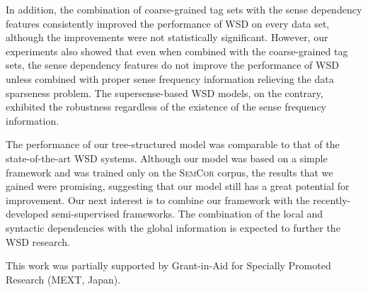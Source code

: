 \documentclass[english]{jnlp_1.4}
\begin{document}
In addition, the combination of coarse-grained tag sets with the sense dependency features consistently improved the performance of WSD on every data set, although the improvements were not statistically significant.
However, our experiments also showed that even when combined with the coarse-grained tag sets, the sense dependency features do not improve the performance of WSD unless combined with proper sense frequency information relieving the data sparseness problem.
The supersense-based WSD models, on the contrary, exhibited the robustness regardless of the existence of the sense frequency information.

The performance of our tree-structured model was comparable to that of the state-of-the-art WSD systems.
Although our model was based on a simple framework and was trained only on the \textsc{SemCor} corpus, the results that we gained were promising, suggesting that our model still has a great potential for improvement.
Our next interest is to combine our framework with the recently-developed semi-supervised frameworks.
The combination of the local and syntactic dependencies with the global information is expected to further the WSD research.



\acknowledgment
This work was partially supported by Grant-in-Aid for Specially Promoted Research (MEXT, Japan).
\end{document}
